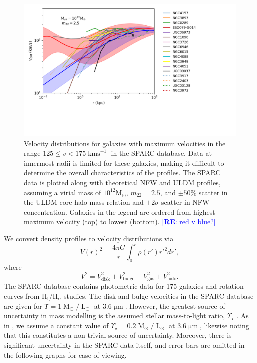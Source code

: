 \documentclass{pasa}%
\newcommand{\re}[1]{\textcolor{blue}{[{\bf RE}: #1]}}
\begin{document}
\begin{figure}[t]
\centering
\includegraphics[scale=0.9, trim={0cm 2.5cm 3cm 0cm}]{000_vs_SPARC_10_12.png}
\caption{Velocity distributions for galaxies with maximum velocities in the range $125 \leq v < 175\operatorname{kms}^{-1}$ in the SPARC database. Data at innermost radii is limited for these galaxies, making it difficult to determine the overall characteristics of the profiles. The SPARC data is plotted along with theoretical NFW and ULDM profiles, assuming a virial mass of $10^{12} \mathrm{M}_{\odot}$, $m_{22} = 2.5$, and $\pm 50 \%$ scatter in the ULDM core-halo mass relation and $\pm2\sigma$ scatter in NFW concentration. Galaxies in the legend are ordered from highest maximum velocity (top) to lowest (bottom).  \re{red v blue?}}\label{fig:high_v} 
\end{figure}

We convert  density profiles to velocity distributions \cite{Sofue:2008wt} via 
%
\begin{equation}
    V(r)^2 = \frac{4\pi G}{r}\int_0^r \rho(r')r'^2 dr',
\end{equation}
where 
\begin{equation}\label{eq:vel_decomp}
    V^2 = V_{\mathrm{disk}}^2 + V_{\mathrm{bulge}}^2 + V_{\mathrm{gas}}^2 + V_{\mathrm{halo}}^2.
\end{equation}
%
The SPARC database contains photometric data for 175 galaxies and rotation curves from $\mathrm{H}_{\mathrm{I}}$/$\mathrm{H}_{\alpha}$ studies. The disk and bulge velocities in the SPARC database are given for $\Upsilon = 1 \operatorname{M}_{\odot}/\operatorname{L}_{\odot}$ at $3.6\operatorname{\mu m}$. However, the greatest source of uncertainty in mass modelling is the assumed stellar mass-to-light ratio, $\Upsilon_\star$ \cite{Lelli:2016zqa}. As in \cite{Robles:2018fur}, we  assume a constant value of $\Upsilon_\star = 0.2 \operatorname{M}_{\odot}/\operatorname{L}_{\odot}$ at $3.6\operatorname{\mu m}$, likewise noting that  this constitutes a non-trivial source of uncertainty. Moreover, there is significant uncertainty in the SPARC data itself, and error bars are omitted in the following graphs for ease of viewing. 
\end{document}
